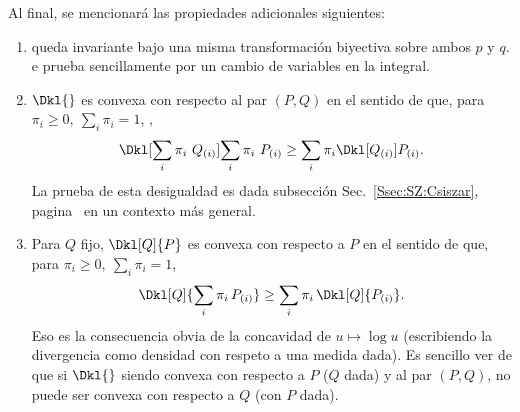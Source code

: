 Al  final, se mencionar\'a las propiedades adicionales siguientes:
%
\begin{enumerate}
\item {}
queda invariante  bajo una  misma transformaci\'on biyectiva  sobre ambos  $p$ y
$q$. e prueba sencillamente por
un cambio de variables en la  integral.
%
\item $\Dkl{}$ es convexa con respecto al par $(P,Q)$ en el sentido de que, para
  $\pi_i \ge 0, \: \sum_i \pi_i = 1$, , 
  \[
  \Dkl[\sum_i   \pi_i  \ Q_{(i)}]{\sum_i   \pi_i \   P_{(i)}}  \ge   \sum_i   \pi_i
  \Dkl[Q_{(i)}]{P_{(i)}}.
  \]
  La  prueba de  esta desigualdad  es dada  subsecci\'on Sec.~\ref{Ssec:SZ:Csiszar},
  pagina~\pageref{Ssec:SZ:Csiszar} en un contexto m\'as general.
%
\item Para $Q$ fijo, $\Dkl[Q]{P}$ es convexa con respecto a $P$ en el sentido de
  que, para $\pi_i \ge 0, \: \sum_i \pi_i = 1$, 
  \[
  \Dkl[Q]{\sum_i   \pi_i \,   P_{(i)}}  \ge   \sum_i   \pi_i
  \, \Dkl[Q]{P_{(i)}}.
  \]
  Eso  es  la  consecuencia  obvia  de  la concavidad  de  $u  \mapsto  \log  u$
  (escribiendo la divergencia  como densidad con respeto a  una medida dada). Es
  sencillo ver de que si $\Dkl{}$ siendo convexa con respecto a $P$ ($Q$ dada) y
  al par $(P,Q)$, no puede ser convexa con respecto a $Q$ (con $P$ dada).
\end{enumerate}
